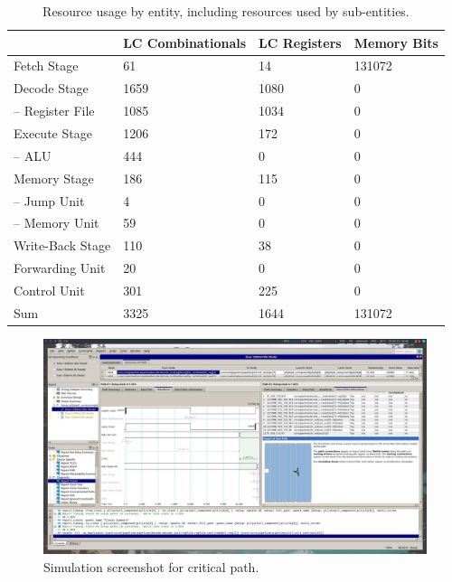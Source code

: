 \begin{table}[htb]
  \centering
  \caption{Resource usage by entity, including resources used by sub-entities.}
  \begin{tabular}{llll}
    \toprule
                         & LC Combinationals & LC Registers & Memory Bits \\
    \midrule
    Fetch Stage          & 61                & 14           & 131072      \\
    Decode Stage         & 1659              & 1080         & 0           \\
    -- Register File     & 1085              & 1034         & 0           \\
    Execute Stage        & 1206              & 172          & 0           \\
    -- ALU               & 444               & 0            & 0           \\
    Memory Stage         & 186               & 115          & 0           \\
    -- Jump Unit         & 4                 & 0            & 0           \\
    -- Memory Unit       & 59                & 0            & 0           \\
    Write-Back Stage     & 110               & 38           & 0           \\
    Forwarding Unit      & 20                & 0            & 0           \\
    Control Unit         & 301               & 225          & 0           \\
    \cmidrule{1-4}
    Sum                  & 3325              & 1644         & 131072      \\
    \bottomrule
  \end{tabular}
\end{table}

\begin{qa}
\end{qa}

\begin{figure}[ht!]
\centering
\framebox[\linewidth]{
}
\includegraphics[width=1.0\linewidth]{task3.jpg}
\caption{Simulation screenshot for critical path.}
\end{figure}
